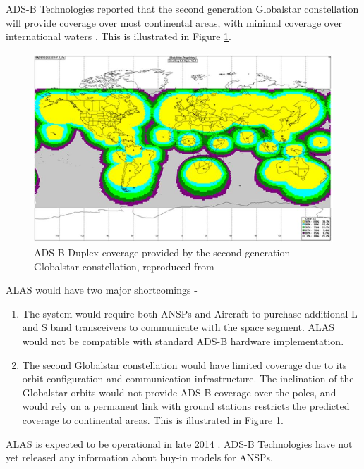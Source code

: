 ADS-B Technologies reported that the second generation Globalstar constellation will provide coverage over most continental areas, with minimal coverage over international waters \cite{ADS-B:Globalstar_webinar}. This is illustrated in Figure \ref{fig:globalstar_adsb}.
\begin{figure}[H]
	\centering
	\includegraphics[scale = 0.7]{Pictures/globalstar_asdb.jpg}
	
	\caption[ADS-B Duplex coverage provided by the second generation Globalstar constellation]{ADS-B Duplex coverage provided by the second generation Globalstar constellation, reproduced from \cite{ADS-B:Globalstar_webinar}}
	\label{fig:globalstar_adsb}
\end{figure} 

ALAS would have two major shortcomings -
\begin{enumerate}
	\item The system would require both ANSPs and Aircraft to purchase additional L and S band transceivers to communicate with the space segment. ALAS would not be compatible with standard ADS-B hardware implementation. 
	\item The second Globalstar constellation would have limited coverage due to its orbit configuration and communication infrastructure. The inclination of the Globalstar orbits would not provide ADS-B coverage over the poles, and would rely on a permanent link with ground stations restricts the predicted coverage to continental areas. This is illustrated in Figure \ref{fig:globalstar_adsb}.
\end{enumerate}

ALAS is expected to be operational in late 2014 \cite{ADS-B:Globalstar_webinar}. ADS-B Technologies have not yet released any information about buy-in models for ANSPs.


